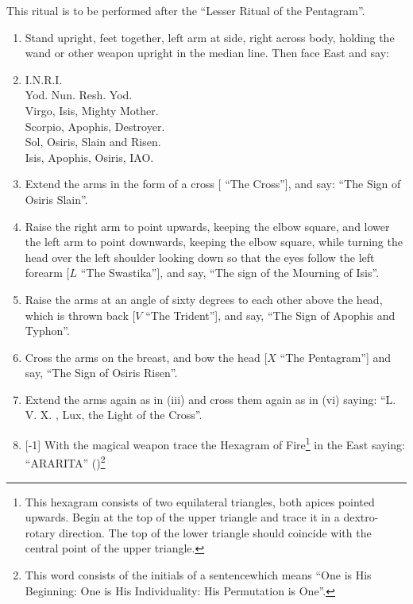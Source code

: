 This ritual is to be performed after the \enquote{Lesser Ritual of the Pentagram}.
\begin{enumerate}[label=(\textit{\Roman*})]
\item Stand upright, feet together, left arm at side, right across body, holding the wand or other weapon upright in the median line. Then face East and say:
\item I.N.R.I. \\
Yod. Nun. Resh. Yod. \\
Virgo, Isis, Mighty Mother. \\
Scorpio, Apophis, Destroyer. \\
Sol, Osiris, Slain and Risen. \\
Isis, Apophis, Osiris, IAO.
\item Extend the arms in the form of a cross [\Cross \textendash{} \enquote{The Cross}], and say: \enquote{The Sign of Osiris Slain}.
\item Raise the right arm to point upwards, keeping the elbow square, and lower the left arm to point downwards, keeping the elbow square, while turning the head over the left shoulder looking down so that the eyes follow the left forearm [$L$ \textendash{} \enquote{The Swastika}], and say, \enquote{The sign of the Mourning of Isis}.
\item Raise the arms at an angle of sixty degrees to each other above the head, which is thrown back [$V$ \textendash{} \enquote{The Trident}], and say, \enquote{The Sign of Apophis and Typhon}.
\item Cross the arms on the breast, and bow the head [$X$ \textendash{} \enquote{The Pentagram}] and say, \enquote{The Sign of Osiris Risen}.
\item Extend the arms again as in (iii) and cross them again as in (vi) saying: \enquote{L.\nolinebreak{} V.\nolinebreak{} X.\nolinebreak{} , Lux, the Light of the Cross}.
\item {}[-1] With the magical weapon trace the Hexagram of Fire\footnote{This hexagram consists of two equilateral triangles, both apices pointed upwards. Begin at the top of the upper triangle and trace it in a dextro-rotary direction. The top of the lower triangle should coincide with the central point of the upper triangle.} in the East saying: \enquote{ARARITA} ()\footnote{This word consists of the initials of a sentence\footnotemark which means \enquote{One is His Beginning: One is His Individuality: His Permutation is One}.}

\end{enumerate}
